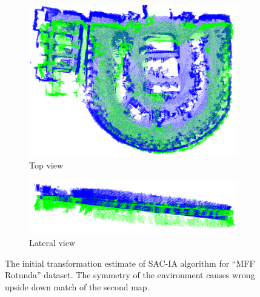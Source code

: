 \begin{figure}
    \centering
    \begin{subfigure}[b]{\textwidth}
        \includegraphics[width=\textwidth]{../img/mff_rotunda_sac_top.png}
        \caption{Top view}
    \end{subfigure}
    \begin{subfigure}[b]{\textwidth}
        \includegraphics[width=\textwidth]{../img/mff_rotunda_sac_lateral.png}
        \caption{Lateral view}
    \end{subfigure}
    \caption[\gls{SAC-IA} initial estimate for ``MFF Rotunda '' dataset.]{The initial transformation estimate of \gls{SAC-IA} algorithm for ``MFF Rotunda'' dataset. The symmetry of the environment causes wrong upside down match of the second map.}
    \label{fig:mff_rotunda_sac}
\end{figure}